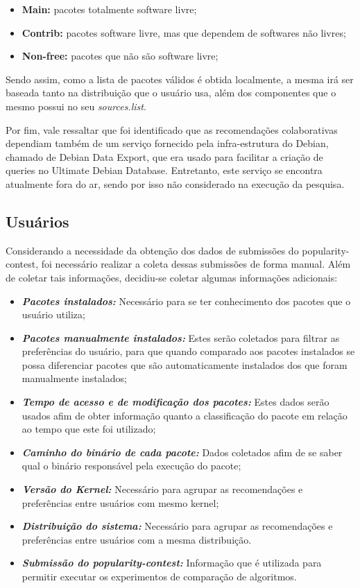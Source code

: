 \begin{itemize}
    \item \textbf{Main:} pacotes totalmente software livre;
    \item \textbf{Contrib:} pacotes software livre, mas que dependem de
        softwares não livres;
    \item \textbf{Non-free:} pacotes que não são software livre;
\end{itemize}

Sendo assim, como a lista de pacotes válidos é obtida localmente, a mesma irá ser baseada tanto na
distribuição que o usuário usa, além dos componentes que o mesmo possui no seu
\textit{sources.list}.

Por fim, vale ressaltar que foi identificado que as recomendações
colaborativas dependiam também de um serviço fornecido pela infra-estrutura do
Debian, chamado de Debian Data Export, que era usado para facilitar a criação de
queries no Ultimate Debian Database. Entretanto, este serviço se encontra
atualmente fora do ar, sendo por isso não considerado na execução da pesquisa.

\subsection{Usuários} \label{sec:coleta_dados_usuario}

Considerando a necessidade da obtenção dos dados de submissões do
popularity-contest, foi necessário realizar a coleta dessas submissões
de forma manual. Além de coletar tais informações, decidiu-se coletar algumas
informações adicionais:

\begin{itemize}
    \item \textit{\textbf{Pacotes instalados:}} Necessário para se ter conhecimento dos pacotes que o usuário utiliza;
    \item \textit{\textbf{Pacotes manualmente instalados:}} Estes serão coletados para filtrar as preferências do usuário, para que quando comparado aos pacotes instalados se possa diferenciar pacotes que são automaticamente instalados dos que foram manualmente instalados;
    \item \textit{\textbf{Tempo de acesso e de modificação dos pacotes:}} Estes dados serão usados afim de obter informação quanto a classificação do pacote em relação ao tempo que este foi utilizado;
    \item \textit{\textbf{Caminho do binário de cada pacote:}} Dados coletados afim de se saber qual o binário responsável pela execução do pacote;
    \item \textit{\textbf{Versão do Kernel:}} Necessário para agrupar as recomendações e preferências entre usuários com mesmo kernel;
    \item \textit{\textbf{Distribuição do sistema:}} Necessário para agrupar as recomendações e preferências entre usuários com a mesma distribuição.
    \item \textit{\textbf{Submissão do popularity-contest:}} Informação que é
        utilizada para permitir executar os experimentos de comparação de
        algoritmos.
\end{itemize}


